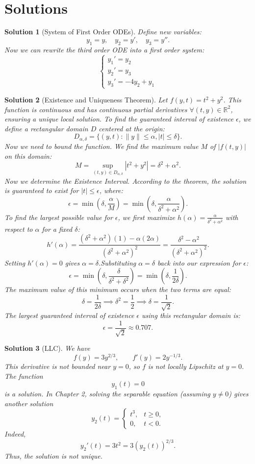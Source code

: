 \documentclass{article}
\newtheorem{solution}{Solution}
\newcommand{\R}{\mathbb{R}}
\begin{document}
\section{Solutions}
\begin{solution}[System of First Order ODEs]
    Define new variables:
    \[y_1 = y, \quad y_2 = y', \quad y_3 = y''.\]
    Now we can rewrite the third order ODE into a first order system:
    \[\begin{cases}
        y_1' = y_2\\
        y_2' = y_3\\
        y_3' = -4y_2 + y_1
    \end{cases}\]
\end{solution}
\begin{solution}[Existence and Uniqueness Theorem]
    Let $f(y,t) = t^2+y^2$. This function is continuous and has continuous partial derivatives $\forall(t,y) \in \R^2$, ensuring a unique local solution. To find the guaranteed interval of existence $\epsilon$, we define a rectangular domain $D$ centered at the origin:
    \[D_{\alpha,\delta} = \{(y,t) : \|y\| \leq \alpha, |t| \leq \delta\}.\]
    Now we need to bound the function. We find the maximum value $M$ of $|f(t, y)|$ on this domain:
    \[M = \sup_{(t, y) \in D_{\alpha, \delta}} |t^2 + y^2| = \delta^2 + \alpha^2.\]
    Now we determine the Existence Interval. According to the theorem, the solution is guaranteed to exist for $|t| \leq \epsilon$, where:
    \[\epsilon = \min \left(\delta, \frac{\alpha}{M}\right) = \min \left(\delta, \frac{\alpha}{\delta^2 + \alpha^2}\right).\]
    To find the largest possible value for $\epsilon$, we first maximize $h(\alpha) = \frac{\alpha}{\delta^2 + \alpha^2}$ with respect to $\alpha$ for a fixed $\delta$:
    \[h'(\alpha) = \frac{(\delta^2 + \alpha^2)(1) - \alpha(2\alpha)}{(\delta^2 + \alpha^2)^2} = \frac{\delta^2 - \alpha^2}{(\delta^2 + \alpha^2)^2}.\]
    Setting $h'(\alpha) = 0$ gives $\alpha = \delta$.Substituting $\alpha = \delta$ back into our expression for $\epsilon$:
    \[\epsilon = \min \left( \delta, \frac{\delta}{\delta^2 + \delta^2} \right) = \min \left( \delta, \frac{1}{2\delta} \right).\]
    The maximum value of this minimum occurs when the two terms are equal:
    \[\delta = \frac{1}{2\delta} \implies \delta^2 = \frac{1}{2} \implies \delta = \frac{1}{\sqrt{2}}.\]
    The largest guaranteed interval of existence $\epsilon$ using this rectangular domain is:
    \[\epsilon = \frac{1}{\sqrt{2}} \approx 0.707.\]
\end{solution}
\begin{solution}[LLC]
    We have
    \[f(y) = 3y^{2/3}, \qquad f'(y) = 2y^{-1/3}.\]
    This derivative is not bounded near \(y=0\), so \(f\) is not locally Lipschitz at \(y=0\).
    The function
    \[y_1(t) = 0\]
    is a solution.
    In Chapter 2, solving the separable equation (assuming \(y \neq 0\)) gives another solution
    \[y_2(t) = \begin{cases}t^3, & t \ge 0, \\ 0, & t < 0.\end{cases}\]
    Indeed,
    \[y_2'(t) = 3t^2 = 3(y_2(t))^{2/3}.\]
    Thus, the solution is not unique.
\end{solution}
\end{document}
